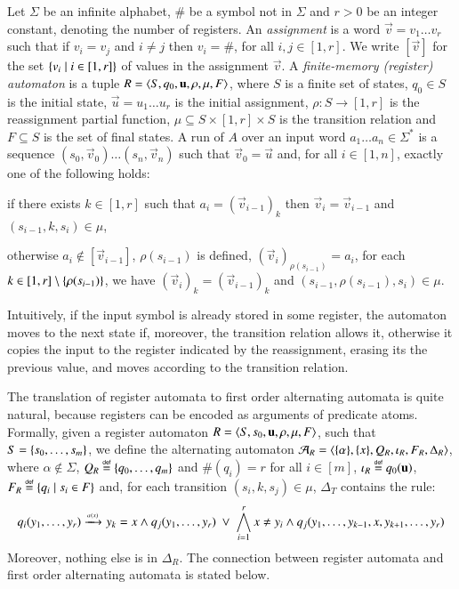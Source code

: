 Let $\Sigma$ be an infinite alphabet, $\#$ be a symbol not in $\Sigma$
and $r>0$ be an integer constant, denoting the number of registers. An
\emph{assignment} is a word $\vec{v} = v_1 \ldots v_r$ such that if
$v_i = v_j$ and $i \neq j$ then $v_i = \#$, for all $i,j \in
     [1,r]$. We write $[\vec{v}]$ for the set $\{ v_i \mid i \in
       [1,r] \}$ of values in the assignment $\vec{v}$. A
     \emph{finite-memory (register) automaton} is a tuple $R =
     \langle S,q_0,\mathbf u, \rho, \mu, F \rangle$, where $S$ is a finite set
     of states, $q_0 \in S$ is the initial state, $\vec{u} = u_1
     \ldots u_r$ is the initial assignment, $\rho : S \rightarrow
            [1,r]$ is the reassignment partial function, $\mu
            \subseteq S \times [1,r] \times S$ is the transition
            relation and $F \subseteq S$ is the set of final states. A
            run of $A$ over an input word $a_1 \ldots a_n \in
            \Sigma^*$ is a sequence $(s_0,\vec{v}_0) \ldots
            (s_n,\vec{v}_n)$ such that $\vec{v}_0 = \vec{u}$ and, for
            all $i \in [1,n]$, exactly one of the following
            holds: \begin{compactitem}
\item if there exists $k\in[1,r]$ such that $a_i=(\vec{v}_{i-1})_k$
  then $\vec{v}_i = \vec{v}_{i-1}$ and $(s_{i-1},k,s_i) \in \mu$, 
%
\item otherwise $a_i\not\in[\vec{v}_{i-1}]$, $\rho(s_{i-1})$ is
  defined, $(\vec{v}_i)_{\rho(s_{i-1})} = a_i$, for each $k \in
  [1,r] \setminus \{ \rho(s_{i-1}) \}$, we have $(\vec{v}_i)_k =
  (\vec{v}_{i-1})_k$ and $(s_{i-1},\rho(s_{i-1}),s_i) \in \mu$.
\end{compactitem}
Intuitively, if the input symbol is already stored in some register,
the automaton moves to the next state if, moreover, the transition
relation allows it, otherwise it copies the input to the register
indicated by the reassignment, erasing its the previous value, and
moves according to the transition relation.

The translation of register automata to first order alternating
automata is quite natural, because registers can be encoded as
arguments of predicate atoms. Formally, given a register automaton $R
= \langle S,s_0,\mathbf u,\rho,\mu,F \rangle$, such that $S =
\{ s_0,\ldots,s_m \}$, we define the alternating automaton $\mathcal{A}_R =
\langle \{ \alpha \},\{ x \},Q_R,\iota_R,F_R,\Delta_R \rangle$, where
$\alpha \not\in \Sigma$, $Q_R \stackrel{\scriptscriptstyle{\mathsf{def}}}{=} \{ q_0,\ldots,q_m \}$ and
$\#(q_i) = r$ for all $i \in [m]$, $\iota_R \stackrel{\scriptscriptstyle{\mathsf{def}}}{=} q_0(\mathbf u)$, $F_R
\stackrel{\scriptscriptstyle{\mathsf{def}}}{=} \{ q_i \mid s_i \in F \}$ and, for each transition $(s_i, k,
s_j) \in \mu$, $\Delta_T$ contains the rule:
\[q_i(y_1,\ldots,y_r) \xrightarrow{{\scriptscriptstyle \alpha(x)}}_{{\scriptstyle }} y_k=x \wedge q_j(y_1,\ldots,y_r) ~\vee~
\bigwedge_{i=1}^r x \neq y_i \wedge q_j(y_1,\ldots,y_{k-1},x,y_{k+1},
\ldots, y_r)\] Moreover, nothing else is in $\Delta_R$. The connection
between register automata and first order alternating automata is
stated below.

